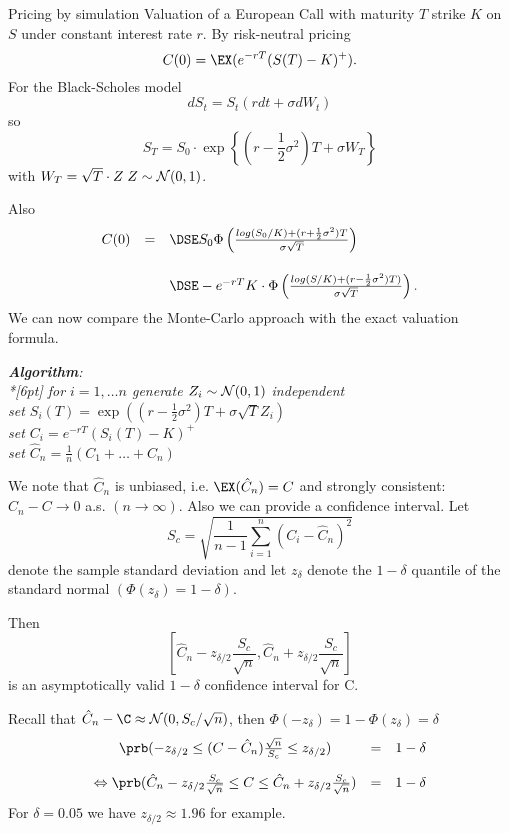 Pricing by simulation
	Valuation of a European Call with maturity $T$ strike $K$ on $S$ under constant interest rate $r$.
	By risk-neutral pricing
		$$
		C(0)=\EX(e^{-rT}(S(T)-K)^+).
		$$
	For the Black-Scholes model
		$$
		dS_t=S_t(rdt+\sigma dW_t)
		$$
	so
		$$
		S_T=S_0\cdot \exp\left\{\left( r-\frac{1}{2}\sigma^2\right)T+\sigma W_T\right\}
		$$
	with $W_T=\sqrt{T}\cdot Z\; Z\sim{\cal N}(0,1)$.

	Also
		$$
		\begin{array}{lll}
		C(0) &=&\DSE S_0\Phi\left(\frac{log(S_0/K)+(r+\frac{1}{2}\sigma^2)T}{\sigma\sqrt{T}}\right)\\*[18pt]
		&&\DSE   -e^{-rT}K\cdot\Phi\left(\frac{log(S/K)+(r-\frac{1}{2}\sigma^2)T)}{\sigma\sqrt{T}}\right).
		\end{array}
		$$
	We can now compare the Monte-Carlo approach with the exact valuation formula.

	{\it {\bf Algorithm}:\\*[6pt]
  for $i=1,\ldots n$ generate $Z_i\sim{\cal N}(0,1)$ independent\\
  set $S_i(T)=\exp((r-\frac{1}{2}\sigma^2)T+\sigma\sqrt{T}Z_i)$\\
  set $C_i=e^{-rT}(S_i(T)-K)^+$\\
  set $\hat{C}_n=\frac{1}{n}(C_1+\ldots +C_n)$
	}

	We note that $\hat{C}_n$ is unbiased, i.e. $\EX(\hat{C}_n)=C$
	and strongly consistent: $\hat{C}_n-C\rightarrow 0$ a.s. $(n\rightarrow
	\infty)$. Also we can provide a confidence interval. Let
	$$
	S_c=\sqrt{\frac{1}{n-1}\sum_{i=1}^n(C_i-\hat{C}_n)^2}
	$$
	denote the sample standard deviation and let $z_\delta$ denote the
	$1-\delta$ quantile of the standard normal
	$(\Phi(z_\delta)=1-\delta)$.
	
	Then
		$$
		\left[\hat{C}_n-z_{\delta/2}\frac{S_c}{\sqrt{n}},
			\hat{C}_n+z_{\delta/2}\frac{S_c}{\sqrt{n}}\right]
		$$
	is an asymptotically valid $1-\delta$ confidence interval for C.


	Recall that $\hat{C}_n-\C\approx{\cal N}(0,S_c/\sqrt{n})$, then
	$\Phi(-z_\delta)=1-\Phi(z_\delta)=\delta$
		$$
		\begin{array}{cll}
		\prb(-z_{\delta/2}\leq(C-\hat{C}_n)\frac{\sqrt{n}}{S_c}\leq z_{\delta/2}) & = & 1-\delta\\*[12pt]
		 \Leftrightarrow \prb(\hat{C}_n-z_{\delta/2}\frac{S_c}{\sqrt{n}}\leq C\leq\hat{C}_n+z_{\delta/2}\frac{S_c}{\sqrt{n}})
		 & =& 1-\delta
		\end{array}
		$$
	For $\delta=0.05$ we have $z_{\delta/2}\approx 1.96$ for example.


